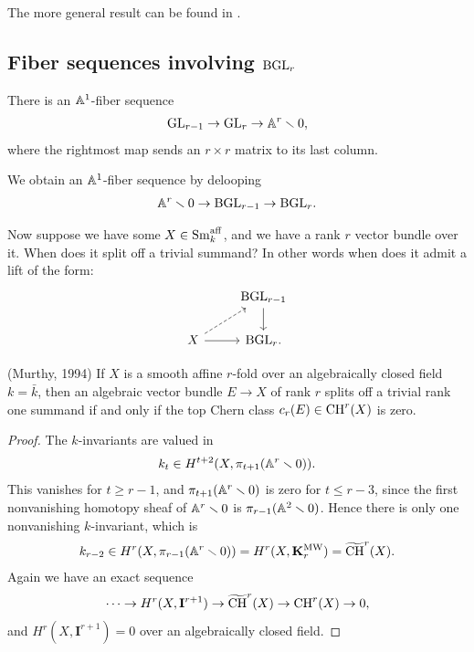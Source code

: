 \documentclass[11pt,openany]{book}
\providecommand{\aff}{\mathrm{aff}}
\providecommand{\KMW}{\mathbf{K}^\mathrm{MW}}
\providecommand{\CHW}{\widetilde{\mathrm{CH}}}
\begin{document}
\begin{remark} The more general result can be found in \cite{Swan67}.
\end{remark}



\subsection{Fiber sequences involving $\mathrm{BGL}_r$}

\begin{proposition} There is an $\mathbb{A}^1$-fiber sequence
\begin{align*}
    \mathrm{GL}_{r-1} \to \mathrm{GL}_r \to \mathbb{A}^r\smallsetminus 0,
\end{align*}
where the rightmost map sends an $r \times r$ matrix to its last column.
\end{proposition}

\begin{corollary} We obtain an $\mathbb{A}^1$-fiber sequence by delooping
\label{cor:BGL_deloop_fiber}
\begin{align*}
    \mathbb{A}^r\smallsetminus 0 \to \mathrm{BGL}_{r-1} \to \mathrm{BGL}_r.
\end{align*}
\end{corollary}

Now suppose we have some $X \in \Sm_k^\aff$, and we have a rank $r$ vector bundle over it. When does it split off a trivial summand? In other words when does it admit a lift of the form:
\[ \begin{tikzcd}
     & \BGL_{r-1}\dar\\
    X\rar\ar[ur,dashed] & \BGL_r.
\end{tikzcd} \]
%

\begin{theorem} (Murthy, 1994) If $X$ is a smooth affine $r$-fold over an algebraically closed field $k = \bar{k}$, then an algebraic vector bundle $E \to X$ of rank $r$ splits off a trivial rank one summand if and only if the top Chern class $c_r(E) \in \mathrm{CH}^r(X)$ is zero.
\end{theorem}
\begin{proof} The $k$-invariants are valued in
\begin{align*}
    k_t \in H^{t+2}(X, \pi_{t+1}(\mathbb{A}^r\smallsetminus 0)).
\end{align*}
This vanishes for $t\ge r-1$, and $\pi_{t+1}(\mathbb{A}^r\smallsetminus 0)$ is zero for $t \le r-3$, since the first nonvanishing homotopy sheaf of $\mathbb{A}^r\smallsetminus 0$ is $\pi_{r-1}(\mathbb{A}^2\smallsetminus 0)$. Hence there is only one nonvanishing $k$-invariant, which is
\begin{align*}
    k_{r-2} \in H^{r}(X, \pi_{r-1}(\A^r\minus 0)) = H^r(X,\KMW_r) = \CHW^r(X).
\end{align*}
%
Again we have an exact sequence
\begin{align*}
    \cdots \to H^r(X,\mathbf{I}^{r+1}) \to \CHW^r(X) \to \CH^r(X) \to 0,
\end{align*}
and $H^r(X,\mathbf{I}^{r+1}) = 0$ over an algebraically closed field.
\end{proof}
\end{document}
